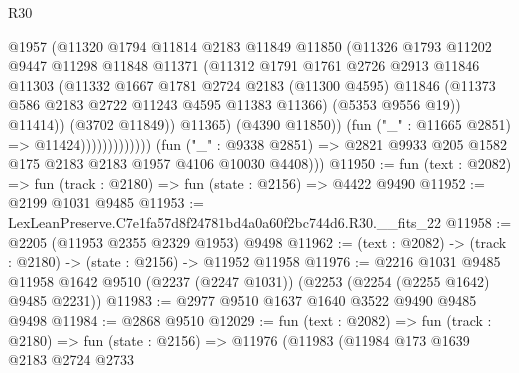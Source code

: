 \begin{lexlean}{R30}
\begin{coremodule}
                                    @1957
                                    (@11320
                                      @1794
                                      @11814
                                      @2183
                                      @11849
                                      @11850
                                      (@11326
                                        @1793
                                        @11202
                                        @9447
                                        @11298
                                        @11848
                                        @11371
                                        (@11312
                                          @1791
                                          @1761
                                          @2726
                                          @2913
                                          @11846
                                          @11303
                                          (@11332
                                            @1667
                                            @1781
                                            @2724
                                            @2183
                                            (@11300 @4595)
                                            @11846
                                            (@11373 @586 @2183 @2722 @11243 @4595 @11383 @11366)
                                            (@5353 @9556 @19))
                                          @11414))
                                      (@3702 @11849))
                                    @11365)
                                  (@4390 @11850))
                                (fun ("_" : @11665 @2851) => @11424)))))))))))))
        (fun ("_" : @9338 @2851) =>
        @2821 @9933 @205 @1582 @175 @2183 @2183 @1957 @4106 @10030 @4408)))
@11950 := fun (text : @2082) => fun (track : @2180) => fun (state : @2156) => @4422 @9490
@11952 := @2199 @1031 @9485
@11953 := LexLeanPreserve.C7e1fa57d8f24781bd4a0a60f2bc744d6.R30.__fits_22
@11958 := @2205 (@11953 @2355 @2329 @1953) @9498
@11962 := (text : @2082) -> (track : @2180) -> (state : @2156) -> @11952 @11958
@11976 := @2216
    @1031
    @9485
    @11958
    @1642
    @9510
    (@2237 (@2247 @1031))
    (@2253 (@2254 (@2255 @1642) @9485 @2231))
@11983 := @2977 @9510 @1637 @1640 @3522 @9490 @9485 @9498
@11984 := @2868 @9510
@12029 := fun (text : @2082) =>
  fun (track : @2180) =>
  fun (state : @2156) =>
  @11976
    (@11983
      (@11984
        @173
        @1639
        @2183
        @2724
        @2733

\end{coremodule}
\end{lexlean}
